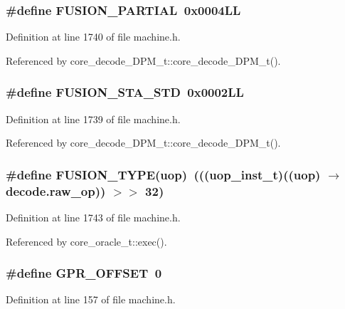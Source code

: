 \subsubsection[{FUSION\_\-PARTIAL}]{\setlength{\rightskip}{0pt plus 5cm}\#define FUSION\_\-PARTIAL~0x0004LL}\label{machine_8h_5933c9cf8c170ff4e5490fd95ee4871a}




Definition at line 1740 of file machine.h.

Referenced by core\_\-decode\_\-DPM\_\-t::core\_\-decode\_\-DPM\_\-t().
\subsubsection[{FUSION\_\-STA\_\-STD}]{\setlength{\rightskip}{0pt plus 5cm}\#define FUSION\_\-STA\_\-STD~0x0002LL}\label{machine_8h_8c844a7367fc58bd77d3bebfe1e4767c}




Definition at line 1739 of file machine.h.

Referenced by core\_\-decode\_\-DPM\_\-t::core\_\-decode\_\-DPM\_\-t().
\subsubsection[{FUSION\_\-TYPE}]{\setlength{\rightskip}{0pt plus 5cm}\#define FUSION\_\-TYPE(uop)~((({\bf uop\_\-inst\_\-t})((uop) $\rightarrow$ decode.raw\_\-op)) $>$$>$ 32)}\label{machine_8h_3e1758a64e4b5e964fbc8d6642fa7023}




Definition at line 1743 of file machine.h.

Referenced by core\_\-oracle\_\-t::exec().
\subsubsection[{GPR\_\-OFFSET}]{\setlength{\rightskip}{0pt plus 5cm}\#define GPR\_\-OFFSET~0}\label{machine_8h_eb7b9d53155abcaf05713f86613ba38e}




Definition at line 157 of file machine.h.
